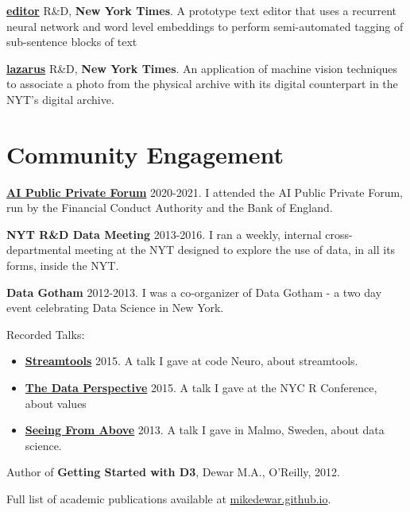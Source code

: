 \documentclass[line, overlapped]{res}
\providecommand{\tightlist}{%
  \setlength{\itemsep}{0pt}\setlength{\parskip}{0pt}}
\begin{document}
\begin{resume}
	\href{http://nytlabs.com/projects/editor.html}{\textbf{editor}} R\&D, \textbf{New York Times}. A prototype text editor that uses a recurrent neural network and word level embeddings to perform semi-automated tagging of sub-sentence blocks of text

	\href{http://nytlabs.com/projects/lazarus.html}{\textbf{lazarus}} R\&D, \textbf{New York Times}. An application of machine vision techniques to associate a photo from the physical archive with its digital counterpart in the NYT's digital archive.

\section{Community Engagement}

	\href{https://www.bankofengland.co.uk/research/fintech/ai-public-private-forum}{\textbf{AI Public Private Forum}} 2020-2021. I attended the AI Public
  Private Forum, run by the Financial Conduct Authority and the Bank of
  England.

  \textbf{NYT R\&D Data Meeting} 2013-2016. I ran a weekly, internal
  cross-departmental meeting at the NYT designed to explore the use of
  data, in all its forms, inside the NYT.

  \textbf{Data Gotham} 2012-2013. I was a co-organizer of Data Gotham -
  a two day event celebrating Data Science in New York.

  Recorded Talks:
  \begin{itemize}
  \tightlist
	  \item \href{https://www.youtube.com/watch?v=23FgdEHOt0w}{\textbf{Streamtools}} 2015. A talk  I gave at code Neuro, about streamtools.

	  \item \href{https://www.youtube.com/watch?v=Jsg4R9z\_Z7M}{\textbf{The Data Perspective}} 2015. A talk I gave at the NYC R Conference, about values 

	  \item \href{http://videos.theconference.se/mike-dewar-big-data-understand-and}{\textbf{Seeing From Above}} 2013. A talk I gave in Malmo, Sweden, about data science.

  \end{itemize}

  Author of \textbf{Getting Started with D3}, Dewar M.A., O'Reilly,
  2012.

  Full list of academic publications available at \href{https://mikedewar.github.io}{mikedewar.github.io}.

\end{resume}
\end{document}
